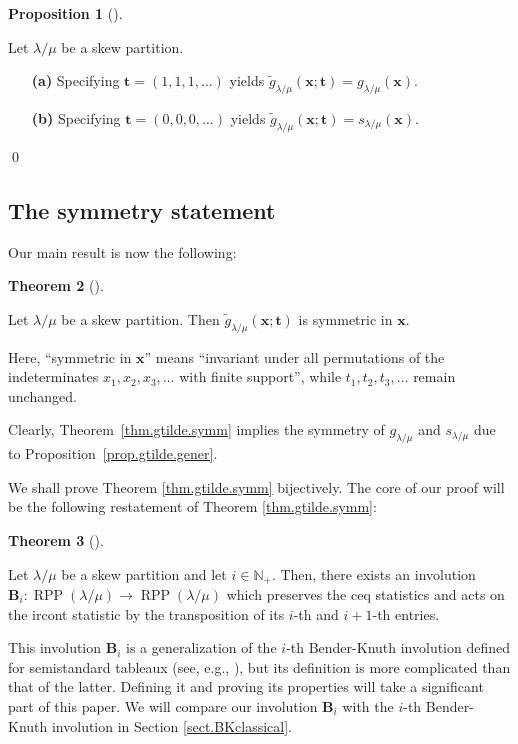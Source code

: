 \documentclass[numbers=enddot,12pt,final,onecolumn,notitlepage]{scrartcl}%
\theoremstyle{definition}
\newtheorem{theo}{Theorem}[section]
\newenvironment{theorem}[1][]
{\begin{theo}[#1]\begin{leftbar}}
{\end{leftbar}\end{theo}}
\newtheorem{prop}[theo]{Proposition}
\newenvironment{proposition}[1][]
{\begin{prop}[#1]\begin{leftbar}}
{\end{leftbar}\end{prop}}
\def\t{{\mathbf{t}}}
\def\x{{\mathbf{x}}}
\def\lm{{\lambda/\mu}}
\begin{document}
\begin{proposition}
\label{prop.gtilde.gener}Let $\lambda/\mu$ be a skew partition.

\begin{enumerate}
\item[\textbf{(a)}] Specifying $\t=\left(
1,1,1,\ldots\right)  $ yields $\widetilde{g}_{\lambda/\mu}(\x;\t)=g_{\lambda/\mu}(\x)$.

\item[\textbf{(b)}] Specifying $\t =\left(
0,0,0,\ldots\right)  $ yields $\widetilde{g}_{\lambda/\mu}(\x;\t)=s_{\lambda/\mu}(\x)$.

\end{enumerate}
\end{proposition} \qed


\subsection{The symmetry statement}

Our main result is now the following:

\begin{theorem}
\label{thm.gtilde.symm}Let $\lambda/\mu$ be a skew partition. Then
$\widetilde{g}_{\lambda/\mu}(\x;\t)$ is symmetric in $\x$.
\end{theorem}

Here, ``symmetric in $\x$'' means ``invariant under all permutations of the indeterminates $x_1, x_2, x_3, \ldots$ with finite support'', while $t_1, t_2, t_3, \ldots$ remain unchanged.

Clearly, Theorem~\ref{thm.gtilde.symm} implies the symmetry of
$g_\lm$ and $s_\lm$ due to Proposition~\ref{prop.gtilde.gener}.


We shall prove Theorem \ref{thm.gtilde.symm} bijectively. The core of our
proof will be the following restatement of Theorem \ref{thm.gtilde.symm}:


 
\begin{theorem}
\label{thm.BK}Let $\lambda/\mu$ be a skew partition and let $i\in\mathbb{N}_{+}$. Then, there exists an
involution $\mathbf{B}_{i}:\operatorname{RPP}\left(  \lambda/\mu\right)
\rightarrow\operatorname{RPP}\left(  \lambda/\mu\right)  $ which preserves the ceq statistics and acts on the ircont statistic by the transposition of its $i$-th and $i+1$-th entries.
\end{theorem}


This involution $\mathbf{B}_{i}$ is a generalization of the $i$-th
Bender-Knuth involution defined for semistandard tableaux (see, e.g.,
\cite[proof of Proposition 2.11]{GriRei15}), but its definition is more
complicated than that of the latter. Defining it and proving its
properties will take a significant part of this paper.
We will compare our involution
$\mathbf{B}_{i}$ with the $i$-th Bender-Knuth involution in Section
\ref{sect.BKclassical}.
\end{document}
